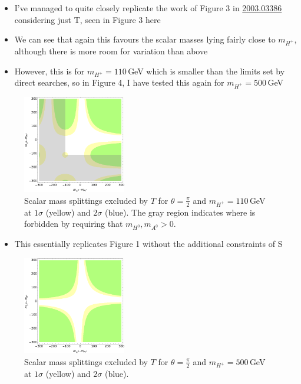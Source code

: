 \documentclass[11pt]{article}
\begin{document}
\newpage
\begin{itemize}
    \item I've managed to quite closely replicate the work of Figure 3 in \href{https://arxiv.org/pdf/2003.03386.pdf}{2003.03386} considering just T, seen in Figure 3 here
    \item We can see that again this favours the scalar masses lying fairly close to $m_{H^+}$, although there is more room for variation than above
    \item However, this is for $m_{H^+}=110\,$GeV which is smaller than the limits set by direct searches, so in Figure 4, I have tested this again for $m_{H^+}=500\,$GeV
\end{itemize}
\begin{figure}[ht]
    \centering
    \includegraphics[width=0.4\textwidth]{obliqueT.png}
    \caption{Scalar mass splittings excluded by $T$ for $\theta=\frac{\pi}{2}$ and $m_{H^+}=110\,$GeV at $1\sigma$ (yellow) and $2\sigma$ (blue). The gray region indicates where is forbidden by requiring that $m_{H^0},m_{A^0}>0$.}
\end{figure}
\begin{itemize}
    \item This essentially replicates Figure 1 without the additional constraints of S
\end{itemize}
\begin{figure}[ht]
    \centering
    \includegraphics[width=0.4\textwidth]{obliqueT2.png}
    \caption{Scalar mass splittings excluded by $T$ for $\theta=\frac{\pi}{2}$ and $m_{H^+}=500\,$GeV at $1\sigma$ (yellow) and $2\sigma$ (blue).}
\end{figure}
\end{document}
